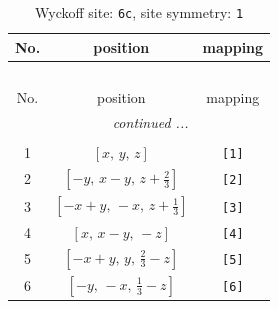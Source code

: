 \documentclass[fleqn,8pt]{jsarticle}
\begin{document}
\renewcommand{\arraystretch}{1.2}
\begin{longtable}{ccc}
\caption{Wyckoff site: {\tt 6c}, site symmetry: {\tt 1}}
 \\
 \hline \hline
No. & position & mapping \\ \hline \endfirsthead

\multicolumn{2}{l}{\tablename\ \thetable{}} \\
 \hline \hline
No. & position & mapping \\ \hline \endhead

 \hline \hline
\multicolumn{2}{r}{\footnotesize\it continued ...} \\ \endfoot

 \hline \hline
\multicolumn{2}{r}{} \\ \endlastfoot

1 & $\left[ x,\, y,\, z \right]$ & {\tt [1]} \\ \hline
2 & $\left[ - y,\, x - y,\, z + \frac{2}{3} \right]$ & {\tt [2]} \\ \hline
3 & $\left[ - x + y,\, - x,\, z + \frac{1}{3} \right]$ & {\tt [3]} \\ \hline
4 & $\left[ x,\, x - y,\, - z \right]$ & {\tt [4]} \\ \hline
5 & $\left[ - x + y,\, y,\, \frac{2}{3} - z \right]$ & {\tt [5]} \\ \hline
6 & $\left[ - y,\, - x,\, \frac{1}{3} - z \right]$ & {\tt [6]} \\
\end{longtable}
\end{document}
